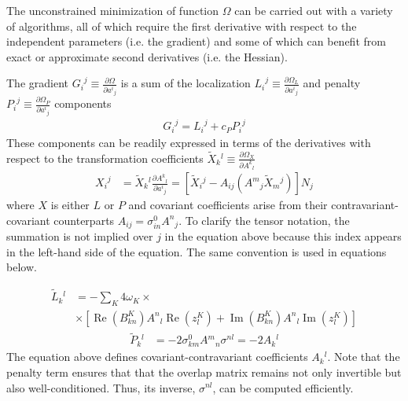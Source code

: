 \documentclass[aps,prl,reprint,amsmath,amssymb]{revtex4-1}
\begin{document}
The unconstrained minimization of function $\Omega$ can be carried out with a variety of algorithms, all of which require the first derivative with respect to the independent parameters (i.e. the gradient) and some of which can benefit from exact or approximate second derivatives (i.e. the Hessian). %

The gradient ${G_i}^j \equiv \frac{\partial \Omega}{\partial {a^i}_j}$ is a sum of the localization ${L_i}^j \equiv \frac{\partial \Omega_L}{\partial {a^i}_j}$ and penalty ${P_i}^j \equiv \frac{\partial \Omega_P}{\partial {a^i}_j}$ components
%
\begin{equation} \label{eq:grad}
\begin{split}
{G_i}^{j} = {L_i}^{j} + c_P {P_i}^{j}
\end{split}
\end{equation}
%
These components can be readily expressed in terms of the derivatives with respect to the transformation coefficients $\tilde{X}{_k}^l \equiv \frac{\partial \Omega_X}{\partial {A^k}_l}$
%
\begin{equation} \label{eq:grad-convert}
\begin{split}
{X_i}^j & = \tilde{X}{_k}^l \frac{\partial {A^k}_l}{\partial {a^i}_j} = \left[ \tilde{X}{_i}^j - A_{ij} ( {A^m}_j \tilde{X}{_m}^j ) \right] N_j
\end{split}
\end{equation}
%
where $X$ is either $L$ or $P$ and covariant coefficients arise from their contravariant-covariant counterparts $A_{ij} = \sigma_{in}^0 {A^n}_j$. To clarify the tensor notation, the summation is not implied over $j$ in the equation above because this index appears in the left-hand side of the equation. The same convention is used in equations below.

\begin{equation} \label{eq:grad-loc}
\begin{split}
\tilde{L}{_k}^l & = - \sum_K {4 \omega_K} \times \\ 
&\times \left[  \operatorname{Re}(B^{K}_{kn}) {A^{n}}_{l} \operatorname{Re}(z_{l}^{K}) + \operatorname{Im}(B^{K}_{kn}) {A^{n}}_{l} \operatorname{Im}(z_{l}^{K}) \right]
\end{split}
\end{equation}
%
\begin{equation} \label{eq:grad-pen}
\begin{split}
\tilde{P}{_k}^l & = -2  \sigma_{km}^0 A{^{m}}_{n} \sigma^{nl} = -2 A{_k}^{l}
\end{split}
\end{equation}
%
The equation above defines covariant-contravariant coefficients $A{_k}^{l}$. Note that the penalty term ensures that that the overlap matrix remains not only invertible but also well-conditioned. Thus, its inverse, $\sigma^{nl}$, can be computed efficiently. 
\end{document}
